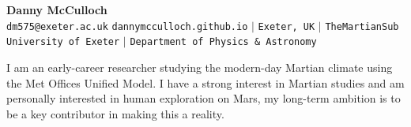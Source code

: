 \documentclass[letterpaper,11pt]{article}
\begin{document}
\begin{center}
    \textbf{\Huge Danny McCulloch} \\ \vspace{5pt}
    \hspace{1pt} \faEnvelope \hspace{2pt} \texttt{dm575@exeter.ac.uk} 
    \hspace{1pt} \faGithub \hspace{2pt} \texttt{dannymcculloch.github.io} 
    \hspace{1pt} $|$ 
    \hspace{1pt} \faMapMarker* \hspace{2pt}\texttt{Exeter, UK}
    \hspace{1pt} $|$ 
    \hspace{1pt} \faTwitter\texttt{TheMartianSub}
    \\
    \texttt{University of Exeter}
    \hspace{1pt}$|$ 
    \texttt{Department of Physics \& Astronomy}
    \\ \vspace{-3pt}
\end{center}


I am an early-career researcher studying the modern-day Martian climate using the Met Offices Unified Model. I have a strong interest in Martian studies and am personally interested in human exploration on Mars, my long-term ambition is to be a key contributor in making this a reality.

\end{document}
